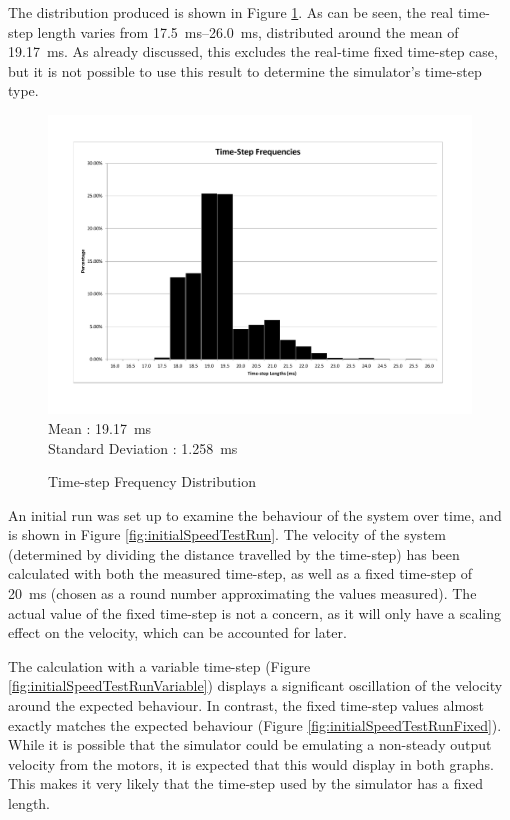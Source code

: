 \documentclass[10pt]{article}
\begin{document}
The distribution produced is shown in Figure \ref{fig:timestepDistribution}.  As
can be seen, the real time-step length varies from
\SIrange{17.5}{26.0}{\milli\second}, distributed around the mean of
\SI{19.17}{\milli\second}.  As already discussed, this excludes the real-time
fixed time-step case, but it is not possible to use this result to determine the
simulator's time-step type.

\begin{figure}
 \includegraphics[width=\textwidth]{Images/time-step-length-distribution} \\
 Mean : \SI{19.17}{\milli\second} \\
 Standard Deviation : \SI{1.258}{\milli\second}

 \caption{Time-step Frequency Distribution}
 \label{fig:timestepDistribution}
\end{figure}

An initial run was set up to examine the behaviour of the system over time, and
is shown in Figure \ref{fig:initialSpeedTestRun}.  The velocity of the system
(determined by dividing the distance travelled by the time-step) has been
calculated with both the measured time-step, as well as a fixed time-step of
\SI{20}{\milli\second} (chosen as a round number approximating the values
measured). The actual value of the fixed time-step is not a concern, as it will
only have a scaling effect on the velocity, which can be accounted for later.

The calculation with a variable time-step (Figure
\ref{fig:initialSpeedTestRunVariable}) displays a significant oscillation of the
velocity around the expected behaviour.  In contrast, the fixed time-step values
almost exactly matches the expected behaviour (Figure
\ref{fig:initialSpeedTestRunFixed}).  While it is possible that the simulator
could be emulating a non-steady output velocity from the motors, it is expected
that this would display in both graphs.  This makes it very likely that the
time-step used by the simulator has a fixed length.
\end{document}
